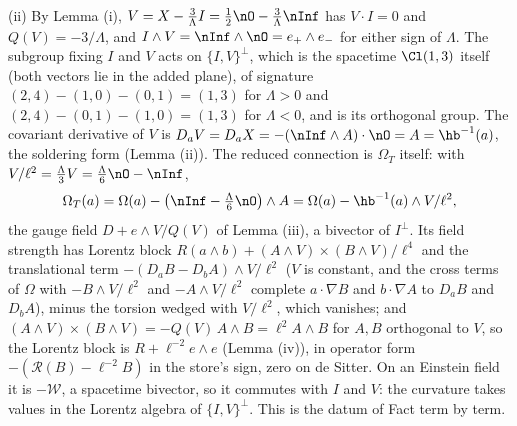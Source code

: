 (ii) By Lemma (i), $V = X - \tfrac{3}{\Lambda}I = \tfrac12\nO - \tfrac{3}{\Lambda}\nInf$ has $V\cdot I = 0$ and $Q(V) = -3/\Lambda$, and $I\wedge V = \nInf\wedge\nO = e_{+}\wedge e_{-}$ for either sign of $\Lambda$. The subgroup fixing $I$ and $V$ acts on $\{I, V\}^{\perp}$, which is the spacetime $\Cl(1,3)$ itself (both vectors lie in the added plane), of signature $(2,4) - (1,0) - (0,1) = (1,3)$ for $\Lambda > 0$ and $(2,4) - (0,1) - (1,0) = (1,3)$ for $\Lambda < 0$, and is its orthogonal group. The covariant derivative of $V$ is $D_{a}V = D_{a}X = -(\nInf\wedge A)\cdot\nO = A = \hb^{-1}(a)$, the soldering form (Lemma (ii)). The reduced connection is $\Omega_{T}$ itself: with $V/\ell^{2} = \tfrac{\Lambda}{3}V = \tfrac{\Lambda}{6}\nO - \nInf$,
\[
\Omega_{T}(a) = \Omega(a) - \bigl(\nInf - \tfrac{\Lambda}{6}\nO\bigr)\wedge A = \Omega(a) - \hb^{-1}(a)\wedge V/\ell^{2},
\]
the gauge field $D + e\wedge V/Q(V)$ of Lemma (iii), a bivector of $I^{\perp}$. Its field strength has Lorentz block $R(a\wedge b) + (A\wedge V)\times(B\wedge V)/\ell^{4}$ and the translational term $-(D_{a}B - D_{b}A)\wedge V/\ell^{2}$ ($V$ is constant, and the cross terms of $\Omega$ with $-B\wedge V/\ell^{2}$ and $-A\wedge V/\ell^{2}$ complete $a\cdot\nabla B$ and $b\cdot\nabla A$ to $D_{a}B$ and $D_{b}A$), minus the torsion wedged with $V/\ell^{2}$, which vanishes; and $(A\wedge V)\times(B\wedge V) = -Q(V)\,A\wedge B = \ell^{2}A\wedge B$ for $A, B$ orthogonal to $V$, so the Lorentz block is $R + \ell^{-2}e\wedge e$ (Lemma (iv)), in operator form $-(\mathcal{R}(B) - \ell^{-2}B)$ in the store's sign, zero on de Sitter. On an Einstein field it is $-\mathcal{W}$, a spacetime bivector, so it commutes with $I$ and $V$: the curvature takes values in the Lorentz algebra of $\{I, V\}^{\perp}$. This is the datum of Fact  term by term.

